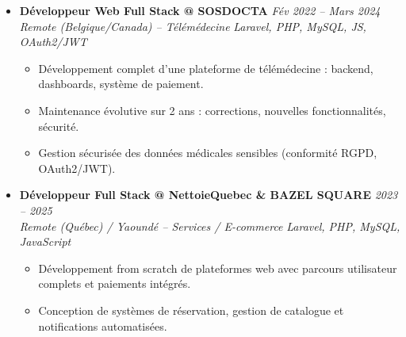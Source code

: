 \documentclass[a4paper,11pt]{article}
\begin{document}
\begin{itemize}[leftmargin=*, label={-}]
\item \textbf{Développeur Web Full Stack @ SOSDOCTA} \hfill \textit{Fév 2022 -- Mars 2024} \\
\textit{Remote (Belgique/Canada) -- Télémédecine} \hfill \textit{Laravel, PHP, MySQL, JS, OAuth2/JWT}
\vspace{-2pt}
    \begin{itemize}[leftmargin=0.4cm, nosep, label=\tiny$\bullet$]
        \item \small{Développement complet d'une plateforme de télémédecine : backend, dashboards, système de paiement.}
        \item \small{Maintenance évolutive sur 2 ans : corrections, nouvelles fonctionnalités, sécurité.}
        \item \small{Gestion sécurisée des données médicales sensibles (conformité RGPD, OAuth2/JWT).}
    \end{itemize}
\vspace{3pt}

\item \textbf{Développeur Full Stack @ NettoieQuebec \& BAZEL SQUARE} \hfill \textit{2023 -- 2025} \\
\textit{Remote (Québec) / Yaoundé -- Services / E-commerce} \hfill \textit{Laravel, PHP, MySQL, JavaScript}
\vspace{-2pt}
    \begin{itemize}[leftmargin=0.4cm, nosep, label=\tiny$\bullet$]
        \item \small{Développement from scratch de plateformes web avec parcours utilisateur complets et paiements intégrés.}
        \item \small{Conception de systèmes de réservation, gestion de catalogue et notifications automatisées.}
    \end{itemize}
\vspace{3pt}

\end{itemize}

\end{document}

